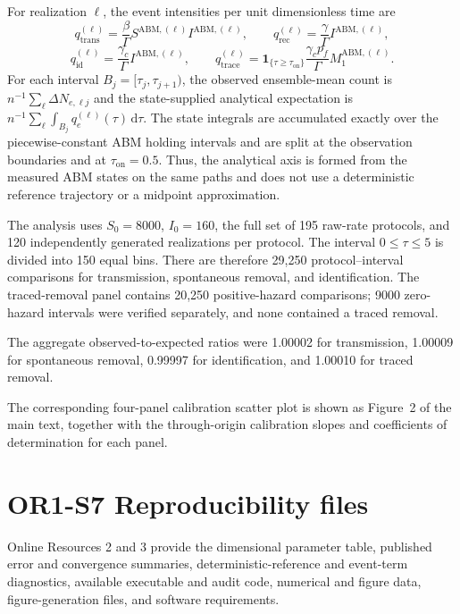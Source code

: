 \documentclass[11pt]{article}
\begin{document}
For realization $\ell$, the event intensities per unit dimensionless time are
\[
q_{\mathrm{trans}}^{(\ell)}=\frac{\beta}{\Gamma}S^{\mathrm{ABM},(\ell)}I^{\mathrm{ABM},(\ell)},
\qquad
q_{\mathrm{rec}}^{(\ell)}=\frac{\gamma}{\Gamma}I^{\mathrm{ABM},(\ell)},
\]
\[
q_{\mathrm{id}}^{(\ell)}=\frac{\gamma_c}{\Gamma}I^{\mathrm{ABM},(\ell)},
\qquad
q_{\mathrm{trace}}^{(\ell)}=
\mathbf 1_{\{\tau\geq\tau_{\mathrm{on}}\}}
\frac{\gamma_c p_f}{\Gamma}M_1^{\mathrm{ABM},(\ell)}.
\]
For each interval $B_j=[\tau_j,\tau_{j+1})$, the observed ensemble-mean count is $n^{-1}\sum_{\ell}\Delta N_{e,\ell j}$ and the state-supplied analytical expectation is $n^{-1}\sum_{\ell}\int_{B_j}q_e^{(\ell)}(\tau)\,\mathrm d\tau$. The state integrals are accumulated exactly over the piecewise-constant ABM holding intervals and are split at the observation boundaries and at $\tau_{\mathrm{on}}=0.5$. Thus, the analytical axis is formed from the measured ABM states on the same paths and does not use a deterministic reference trajectory or a midpoint approximation.

The analysis uses $S_0=8000$, $I_0=160$, the full set of 195 raw-rate protocols, and 120 independently generated realizations per protocol. The interval $0\leq\tau\leq5$ is divided into 150 equal bins. There are therefore 29,250 protocol--interval comparisons for transmission, spontaneous removal, and identification. The traced-removal panel contains 20,250 positive-hazard comparisons; 9000 zero-hazard intervals were verified separately, and none contained a traced removal.

The aggregate observed-to-expected ratios were 1.00002 for transmission, 1.00009 for spontaneous removal, 0.99997 for identification, and 1.00010 for traced removal.

The corresponding four-panel calibration scatter plot is shown as Figure~2 of the main text, together with the through-origin calibration slopes and coefficients of determination for each panel.

\section*{OR1-S7 Reproducibility files}
Online Resources 2 and 3 provide the dimensional parameter table, published error and convergence summaries, deterministic-reference and event-term diagnostics, available executable and audit code, numerical and figure data, figure-generation files, and software requirements.
\end{document}
